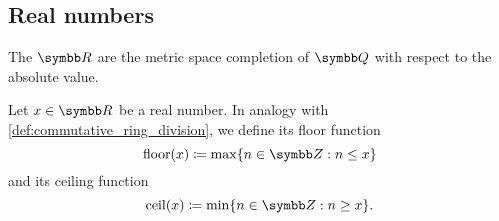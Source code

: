 \subsection{Real numbers}\label{subsec:real_numbers}

\begin{definition}\label{def:real_numbers}
  The  \( \R \) are the metric space completion of \( \Q \) with respect to the absolute value.
\end{definition}

\begin{definition}\label{def:floor_ceiling_functions}
  Let \( x \in \R \) be a real number. In analogy with \cref{def:commutative_ring_division}, we define its floor function
  \begin{equation*}
    \Floor(x) \coloneqq \max \{ n \in \Z : n \leq x \}
  \end{equation*}
  and its ceiling function
  \begin{equation*}
    \Ceil(x) \coloneqq \min \{ n \in \Z : n \geq x \}.
  \end{equation*}
\end{definition}
